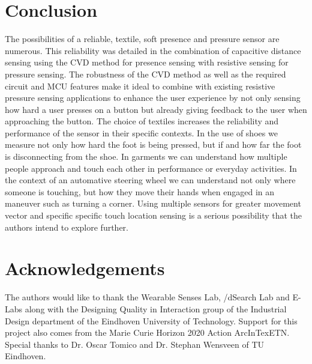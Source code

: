 \documentclass{sigchi-ext}
\begin{document}
\section{Conclusion}
The possibilities of a reliable, textile, soft presence and pressure sensor are numerous. This reliability was detailed in the combination of capacitive distance sensing using the CVD method for presence sensing with resistive sensing for pressure sensing. The robustness of the CVD method as well as the required circuit and MCU features make it ideal to combine with existing resistive pressure sensing applications to enhance the user experience by not only sensing how hard a user presses on a button but already giving feedback to the user when approaching the button. The choice of textiles increases the reliability and performance of the sensor in their specific contexts. In the use of shoes we measure not only how hard the foot is being pressed, but if and how far the foot is disconnecting from the shoe. In garments we can understand how multiple people approach and touch each other in performance or everyday activities. 
In the context of an automative steering wheel we can understand not only where someone is touching, but how they move their hands when engaged in an maneuver such as turning a corner. Using multiple sensors for greater movement vector and specific specific touch location sensing is a serious possibility that the authors intend to explore further. 

\section{Acknowledgements}
The authors would like to thank the Wearable Senses Lab, /dSearch Lab and E-Labs
along with the Designing Quality in Interaction group of the Industrial Design
department of the Eindhoven University of Technology. Support for this project
also comes from the Marie Curie Horizon 2020 Action ArcInTexETN. Special thanks
to Dr. Oscar Tomico and Dr. Stephan Wensveen of TU Eindhoven.

\balance{} 


\end{document}

